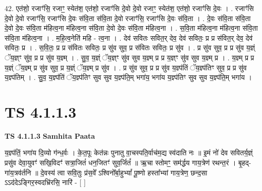 \documentclass[17pt]{extarticle}
\begin{document}
42. एत॑शो॒ रजाꣳ॑सि॒ रजाꣳ॒॒ स्येत॑श॒ एत॑शो॒ रजाꣳ॑सि दे॒वो दे॒वो रजाꣳ॒॒ स्येत॑श॒ एत॑शो॒ रजाꣳ॑सि दे॒वः । . रजाꣳ॑सि दे॒वो दे॒वो रजाꣳ॑सि॒ रजाꣳ॑सि दे॒वः स॑वि॒ता स॑वि॒ता दे॒वो रजाꣳ॑सि॒ रजाꣳ॑सि दे॒वः स॑वि॒ता । . दे॒वः स॑वि॒ता स॑वि॒ता दे॒वो दे॒वः स॑वि॒ता म॑हित्व॒ना म॑हित्व॒ना स॑वि॒ता दे॒वो दे॒वः स॑वि॒ता म॑हित्व॒ना । . स॒वि॒ता म॑हित्व॒ना म॑हित्व॒ना स॑वि॒ता स॑वि॒ता म॑हित्व॒ना । . म॒हि॒त्व॒नेति॑ महि - त्व॒ना । . देव॑ सवितः सवित॒र् देव॒ देव॑ सवितः॒ प्र प्र स॑वित॒र् देव॒ देव॑ सवितः॒ प्र । . स॒वि॒तः॒ प्र प्र स॑वितः सवितः॒ प्र सु॑व सुव॒ प्र स॑वितः सवितः॒ प्र सु॑व । . प्र सु॑व सुव॒ प्र प्र सु॑व य॒ज्ञ्ं ॅय॒ज्ञ्ꣳ सु॑व॒ प्र प्र सु॑व य॒ज्ञ्म् । . सु॒व॒ य॒ज्ञ्ं ॅय॒ज्ञ्ꣳ सु॑व सुव य॒ज्ञ्म् प्र प्र य॒ज्ञ्ꣳ सु॑व सुव य॒ज्ञ्म् प्र । . य॒ज्ञ्म् प्र प्र य॒ज्ञ्ं ॅय॒ज्ञ्म् प्र सु॑व सुव॒ प्र य॒ज्ञ्ं ॅय॒ज्ञ्म् प्र सु॑व । . प्र सु॑व सुव॒ प्र प्र सु॑व य॒ज्ञ्प॑तिं ॅय॒ज्ञ्प॑तिꣳ सुव॒ प्र प्र सु॑व य॒ज्ञ्प॑तिम् । . सु॒व॒ य॒ज्ञ्प॑तिं ॅय॒ज्ञ्प॑तिꣳ सुव सुव य॒ज्ञ्प॑ति॒म् भगा॑य॒ भगा॑य य॒ज्ञ्प॑तिꣳ सुव सुव य॒ज्ञ्प॑ति॒म् भगा॑य । \newline
\pagebreak
{}

\section{ TS 4.1.1.3 }

\textbf{TS 4.1.1.3 } \newline
\textbf{Samhita Paata} \newline

य॒ज्ञ्प॑तिं॒ भगा॑य दि॒व्यो ग॑न्ध॒र्वः । के॒त॒पूः केत॑न्नः पुनातु वा॒चस्पति॒र्वाच॑म॒द्य स्व॑दाति नः ॥ इ॒मं नो॑ देव सवितर्य॒ज्ञ्ं प्रसु॑व देवा॒युवꣳ॑ सखि॒विदꣳ॑ सत्रा॒जितं॑ धन॒जितꣳ॑ सुव॒र्जितं᳚ ॥ ऋ॒चा स्तोमꣳ॒॒ सम॑र्द्धय गाय॒त्रेण॑ रथन्त॒रं । बृ॒हद्-गा॑य॒त्रव॑र्तनि ॥ दे॒वस्य॑ त्वा सवि॒तुः प्र॑स॒वे᳚ ऽश्विनो᳚र्बा॒हुभ्यां᳚ पू॒ष्णो हस्ता᳚भ्यां गाय॒त्रेण॒ छन्द॒सा ऽऽद॑देऽङ्गिर॒स्वदभ्रि॑रसि॒ नारि॑ - [  ] \newline
\end{document}
